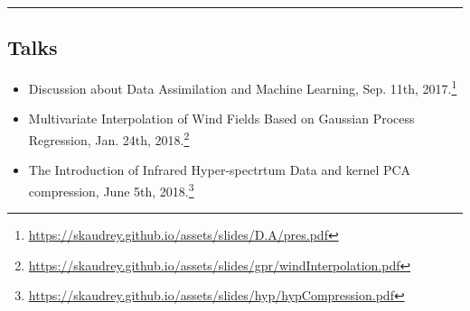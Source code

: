 \documentclass[10pt,letterpaper]{article}
\begin{document}
\hrule
\vspace{-0.4em}
\subsection*{Talks}

\begin{itemize}
	\parskip=0.1em
	
	\item Discussion about Data Assimilation and Machine Learning, Sep. 11th, 2017.\footnote{\url{https://skaudrey.github.io/assets/slides/D.A/pres.pdf}}

	\item Multivariate Interpolation of Wind Fields Based on Gaussian Process Regression, Jan. 24th, 2018.\footnote{\url{https://skaudrey.github.io/assets/slides/gpr/windInterpolation.pdf}}
	
	\item The Introduction of Infrared Hyper-spectrtum Data and kernel PCA compression, June 5th, 2018.\footnote{\url{https://skaudrey.github.io/assets/slides/hyp/hypCompression.pdf}}
	
\end{itemize}
\end{document}
